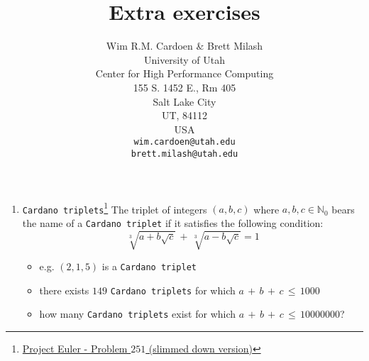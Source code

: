 \documentclass[10pt]{article}
\begin{document}
\title{Extra exercises}
\author{Wim R.M. Cardoen \& Brett Milash\\
        University of Utah\\
        Center for High Performance Computing\\
        155 S. 1452 E., Rm 405\\
        Salt Lake City\\
        UT, 84112\\
        USA\\
        \texttt{wim.cardoen@utah.edu}\\
	\texttt{brett.milash@utah.edu}}
\renewcommand{\today}{February 18, 2024}
\renewcommand{\labelitemii}{$\star$}
\maketitle

\begin{enumerate}
	\item \texttt{Cardano triplets}\footnote{\href{https://www.projecteuler.net/problem=251}{Project Euler - Problem $251$ (slimmed down version)}}\newline
  	 The triplet of integers $(a,b,c)$ where $a,b,c \in \mathbb{N}_0$ bears the name 
         of a \texttt{Cardano triplet} if it satisfies the following condition:
  	 \begin{equation}
  	    \displaystyle \sqrt[3]{a+b\sqrt{c}}\,+\, \sqrt[3]{a-b\sqrt{c}}   =   1 \nonumber
	 \end{equation}		
         \begin{itemize}
            \item e.g. $(2,1,5)$ is a \texttt{Cardano triplet}
            \item there exists $149$ \texttt{Cardano triplets} for which $a\,+\,b\,+\,c\,\le\,1000$
            \item how many \texttt{Cardano triplets} exist for which $a\,+\,b\,+\,c\,\le\,10000000$?
         \end{itemize}			 
\end{enumerate}
\renewcommand \thesection{\Roman{section}}

%
%
\end{document}
